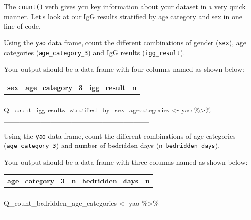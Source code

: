 \documentclass[
  letterpaper,
  DIV=11,
  numbers=noendperiod]{scrreprt}
\newenvironment{Shaded}{\begin{snugshade}}{\end{snugshade}}
\newcommand{\NormalTok}[1]{\textcolor[rgb]{0.00,0.23,0.31}{#1}}
\newcommand{\OtherTok}[1]{\textcolor[rgb]{0.00,0.23,0.31}{#1}}
\newcommand{\SpecialCharTok}[1]{\textcolor[rgb]{0.37,0.37,0.37}{#1}}
\begin{document}
\begin{tcolorbox}[enhanced jigsaw, title=\textcolor{quarto-callout-tip-color}{\faLightbulb}\hspace{0.5em}{Practice}, colbacktitle=quarto-callout-tip-color!10!white, leftrule=.75mm, arc=.35mm, opacityback=0, bottomrule=.15mm, rightrule=.15mm, toptitle=1mm, breakable, toprule=.15mm, colback=white, coltitle=black, colframe=quarto-callout-tip-color-frame, bottomtitle=1mm, titlerule=0mm, left=2mm, opacitybacktitle=0.6]

The \texttt{count()} verb gives you key information about your dataset
in a very quick manner. Let's look at our IgG results stratified by age
category and sex in one line of code.

Using the \texttt{yao} data frame, count the different combinations of
gender (\texttt{sex}), age categories (\texttt{age\_category\_3}) and
IgG results (\texttt{igg\_result}).

Your output should be a data frame with four columns named as shown
below:

\begin{longtable}[]{@{}llll@{}}
\toprule\noalign{}
sex & age\_category\_3 & igg\_result & n \\
\midrule\noalign{}
\endhead
\bottomrule\noalign{}
\endlastfoot
& & & \\
\end{longtable}

\begin{Shaded}
\begin{Highlighting}[]
\NormalTok{Q\_count\_iggresults\_stratified\_by\_sex\_agecategories }\OtherTok{\textless{}{-}} 
\NormalTok{  yao }\SpecialCharTok{\%\textgreater{}\%}
\NormalTok{  \_\_\_\_\_\_\_\_\_\_\_\_\_\_\_\_\_\_\_\_\_\_\_\_\_\_\_\_}
\end{Highlighting}
\end{Shaded}

Using the \texttt{yao} data frame, count the different combinations of
age categories (\texttt{age\_category\_3}) and number of bedridden days
(\texttt{n\_bedridden\_days}).

Your output should be a data frame with three columns named as shown
below:

\begin{longtable}[]{@{}lll@{}}
\toprule\noalign{}
age\_category\_3 & n\_bedridden\_days & n \\
\midrule\noalign{}
\endhead
\bottomrule\noalign{}
\endlastfoot
& & \\
\end{longtable}

\begin{Shaded}
\begin{Highlighting}[]
\NormalTok{Q\_count\_bedridden\_age\_categories }\OtherTok{\textless{}{-}} 
\NormalTok{  yao }\SpecialCharTok{\%\textgreater{}\%}
\NormalTok{  \_\_\_\_\_\_\_\_\_\_\_\_\_\_\_\_\_\_\_\_\_\_\_\_\_\_\_\_}
\end{Highlighting}
\end{Shaded}

\end{tcolorbox}
\end{document}
